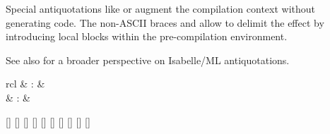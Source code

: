 \begin{isabellebody}
\begin{isamarkuptext}
  Special antiquotations like  or  augment the compilation context without generating code.  The
  non-ASCII braces  and  allow to delimit the
  effect by introducing local blocks within the pre-compilation
  environment.

  \medskip See also \cite{Wenzel-Chaieb:2007b} for a broader
  perspective on Isabelle/ML antiquotations.%
\end{isamarkuptext}%
\isamarkuptrue%
%
\isadelimmlantiq
%
\endisadelimmlantiq
%
\isatagmlantiq
%
\begin{isamarkuptext}%
\begin{matharray}{rcl}
  \hypertarget{ML antiquotation.let}{\hyperlink{ML antiquotation.let}{\mbox{}}} & : &  \\
  \hypertarget{ML antiquotation.note}{\hyperlink{ML antiquotation.note}{\mbox{}}} & : &  \\
  \end{matharray}

  \begin{railoutput}
[]
\rail@plus
\rail@plus
{}[]
[]
\rail@endplus
{}[]
[]
[]
\rail@endplus
\rail@end
{}
[]
\rail@plus
\rail@bar
{}
[]
\rail@endbar
{}[]
[]
\rail@endplus
\rail@end
\end{railoutput}


  \begin{description}


\end{description}
\end{isamarkuptext}
\end{isabellebody}
